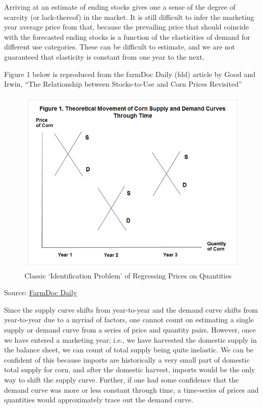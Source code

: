 \documentclass[]{book}
\theoremstyle{definition}
\theoremstyle{definition}
\theoremstyle{remark}
\begin{document}
Arriving at an estimate of ending stocks gives one a sense of the degree
of scarcity (or lack-thereof) in the market. It is still difficult to
infer the marketing year average price from that, because the prevailing
price that should coincide with the forecasted ending stocks is a
function of the elasticities of demand for different use categories.
These can be difficult to estimate, and we are not guaranteed that
elasticity is constant from one year to the next.

Figure 1 below is reproduced from the farmDoc Daily (fdd) article by
Good and Irwin, ``The Relationship between Stocks-to-Use and Corn Prices
Revisited''

\begin{figure}[htbp]
\centering
\includegraphics{images/fdd04092015_fig1.jpg}
\caption{Classic `Identification Problem' of Regressing Prices on
Quantities}
\end{figure}

Source:
\href{http://farmdocdaily.illinois.edu/2015/04/relationship-stock-to-use-and-corn-prices.html}{FarmDoc
Daily}

Since the supply curve shifts from year-to-year and the demand curve
shifts from year-to-year due to a myriad of factors, one cannot count on
estimating a single supply or demand curve from a series of price and
quantity pairs. However, once we have entered a marketing year; i.e., we
have harvested the domestic supply in the balance sheet, we can count of
total supply being quite inelastic. We can be confident of this because
imports are historically a very small part of domestic total supply for
corn, and after the domestic harvest, imports would be the only way to
shift the supply curve. Further, if one had some confidence that the
demand curve was more or less constant through time, a time-series of
prices and quantities would approximately trace out the demand curve.
\end{document}

